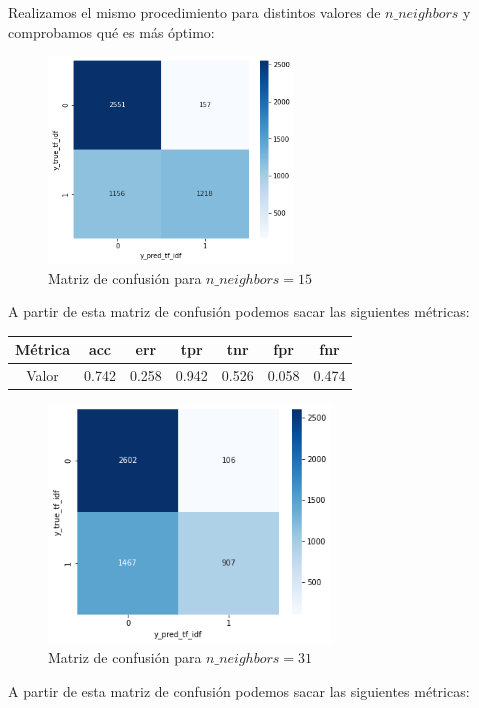 \documentclass[conference,a4paper]{IEEEtran}
\begin{document}
Realizamos el mismo procedimiento para distintos valores de $n\_neighbors$ y comprobamos qué es más óptimo: \\

\begin{figure}[h]
  \centering
  \includegraphics[width=65mm]{knn_15}
  \caption{Matriz de confusión para $n\_neighbors=15$}
  \label{fig:ejemplo}
\end{figure}

A partir de esta matriz de confusión podemos sacar las siguientes métricas:

\begin{center}
\begin{tabular}{ |c|c|c|c|c|c|c| }
 \hline
 Métrica & acc & err & tpr & tnr & fpr & fnr \\ 
 \hline
 Valor & 0.742 & 0.258 & 0.942 & 0.526 & 0.058 & 0.474 \\ 
 \hline
\end{tabular}
\end{center}

\begin{figure}[h]
  \centering
  \includegraphics[width=75mm]{knn_31}
  \caption{Matriz de confusión para $n\_neighbors=31$}
  \label{fig:ejemplo}
\end{figure}

A partir de esta matriz de confusión podemos sacar las siguientes métricas:
\end{document}
